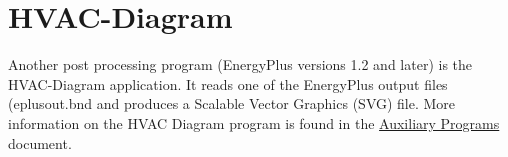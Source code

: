 \section{HVAC-Diagram}\label{hvac-diagram}

Another post processing program (EnergyPlus versions 1.2 and later) is the HVAC-Diagram application. It reads one of the EnergyPlus output files (eplusout.bnd and produces a Scalable Vector Graphics (SVG) file. More information on the HVAC Diagram program is found in the \href{AuxiliaryPrograms.pdf}{Auxiliary Programs} document.
